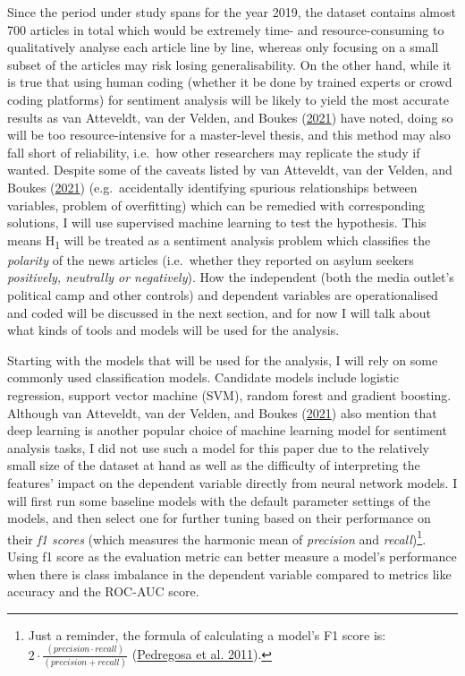 \documentclass[a4paper, oneside]{report}
\begin{document}
Since the period under study spans for the year 2019, the dataset
contains almost 700 articles in total which would be extremely time- and
resource-consuming to qualitatively analyse each article line by line,
whereas only focusing on a small subset of the articles may risk losing
generalisability. On the other hand, while it is true that using human
coding (whether it be done by trained experts or crowd coding platforms)
for sentiment analysis will be likely to yield the most accurate results
as van Atteveldt, van der Velden, and Boukes
(\protect\hyperlink{ref-vanatteveldtValiditySentimentAnalysis2021}{2021})
have noted, doing so will be too resource-intensive for a master-level
thesis, and this method may also fall short of reliability, i.e.~how
other researchers may replicate the study if wanted. Despite some of the
caveats listed by van Atteveldt, van der Velden, and Boukes
(\protect\hyperlink{ref-vanatteveldtValiditySentimentAnalysis2021}{2021})
(e.g.~accidentally identifying spurious relationships between variables,
problem of overfitting) which can be remedied with corresponding
solutions, I will use supervised machine learning to test the
hypothesis. This means H\textsubscript{1} will be treated as a sentiment
analysis problem which classifies the \emph{polarity} of the news
articles (i.e.~whether they reported on asylum seekers \emph{positively,
neutrally or negatively}). How the independent (both the media outlet's
political camp and other controls) and dependent variables are
operationalised and coded will be discussed in the next section, and for
now I will talk about what kinds of tools and models will be used for
the analysis.

Starting with the models that will be used for the analysis, I will rely
on some commonly used classification models. Candidate models include
logistic regression, support vector machine (SVM), random forest and
gradient boosting. Although van Atteveldt, van der Velden, and Boukes
(\protect\hyperlink{ref-vanatteveldtValiditySentimentAnalysis2021}{2021})
also mention that deep learning is another popular choice of machine
learning model for sentiment analysis tasks, I did not use such a model
for this paper due to the relatively small size of the dataset at hand
as well as the difficulty of interpreting the features' impact on the
dependent variable directly from neural network models. I will first run
some baseline models with the default parameter settings of the models,
and then select one for further tuning based on their performance on
their \emph{f1 scores} (which measures the harmonic mean of
\emph{precision} and \emph{recall})\footnote{Just a reminder, the
  formula of calculating a model's F1 score is:
  \(2\cdot\frac{\left(precision\cdot recall\right)}{\left(precision+recall\right)}\)
  (\protect\hyperlink{ref-pedregosaScikitlearnMachineLearning2011}{Pedregosa
  et al. 2011}).}. Using f1 score as the evaluation metric can better
measure a model's performance when there is class imbalance in the
dependent variable compared to metrics like accuracy and the ROC-AUC
score.
\end{document}
